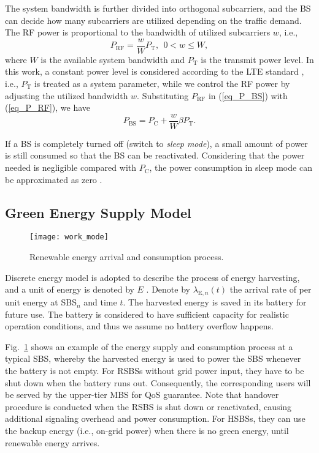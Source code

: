 \documentclass[12pt, draftclsnofoot,onecolumn]{IEEEtran}
\begin{document}
The system bandwidth is further divided into orthogonal subcarriers, and the BS can decide how many subcarriers are utilized depending on the traffic demand.
The RF power is proportional to the bandwidth of utilized subcarriers $w$, i.e.,
\begin{equation}\label{eq_P_RF}
    P_\mathrm{RF} = \frac{w}{W} P_\mathrm{T},~~0 < w \leq W,
\end{equation}
where $W$ is the available system bandwidth and $P_\mathrm{T}$ is the transmit power level.
In this work, a constant power level is considered according to the LTE standard \cite{LTE_standard}, i.e., $P_\mathrm{T}$ is treated as a system parameter, while we control the RF power by adjusting the utilized bandwidth $w$.
Substituting $P_\mathrm{RF}$ in (\ref{eq_P_BS}) with (\ref{eq_P_RF}), we have
\begin{equation}\label{eq_P_BS_2}
    P_\mathrm{BS} = P_\mathrm{C} + \frac{w}{W} \beta P_\mathrm{T}.
\end{equation}

If a BS is completely turned off (switch to \emph{sleep mode}), a small amount of power is still consumed so that the BS can be reactivated.
Considering that the power needed is negligible compared with $P_\mathrm{C}$, the power consumption in sleep mode can be approximated as zero \cite{LTE_standard}.

\subsection{Green Energy Supply Model}

\begin{figure}
\centering
  \texttt{[image: work\_mode]}\\
  \caption{Renewable energy arrival and consumption process.}\label{fig_work_mode}
\end{figure}

Discrete energy model is adopted to describe the process of energy harvesting, and a unit of energy is denoted by $E$ \cite{xiaoxia_EH_d2d}.
Denote by $\lambda_{\mathrm{E},n}(t)$ the arrival rate of per unit energy at SBS$_n$ and time $t$.
The harvested energy is saved in its battery for future use.
The battery is considered to have sufficient capacity for realistic operation conditions, and thus we assume no battery overflow happens.

Fig.~\ref{fig_work_mode} shows an example of the energy supply and consumption process at a typical SBS, whereby the harvested energy is used to power the SBS whenever the battery is not empty.
For RSBSs without grid power input, they have to be shut down when the battery runs out.
Consequently, the corresponding users will be served by the upper-tier MBS for QoS guarantee.
Note that handover procedure is conducted when the RSBS is shut down or reactivated, causing additional signaling overhead and power consumption.
For HSBSs, they can use the backup energy (i.e., on-grid power) when there is no green energy, until renewable energy arrives.
\end{document}
